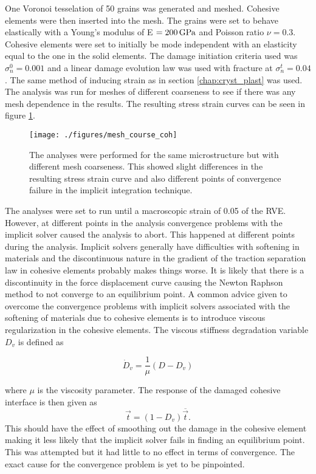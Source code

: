 \documentclass[grain_boundary_law.tex]{subfiles}
\begin{document}
One Voronoi tesselation of 50 grains was generated and meshed. Cohesive elements were then inserted into the mesh. The grains were set to behave elastically with a Young's modulus of E $= \unit[200]{GPa}$ and Poisson ratio $\nu = 0.3$. Cohesive elements were set to initially be mode independent with an elasticity equal to the one in the solid elements. The damage initiation criteria used was $\sigma_n^0 = 0.001$ and a linear damage evolution law was used with fracture at $\sigma_n^t = 0.04$. The same method of inducing strain as in section \ref{chap:cryst_plast} was used. The analysis was run for meshes of different coarseness to see if there was any mesh dependence in the results. The resulting stress strain curves can be seen in figure \ref{fig:coarse_coh}.
%
%
\begin{figure}[htpb!]
\centering
\texttt{[image: ./figures/mesh\_course\_coh]}
\caption{The analyses were performed for the same microstructure but with different mesh coarseness. This showed slight differences in the resulting stress strain curve and also different points of convergence failure in the implicit integration technique.}
\label{fig:coarse_coh}
\end{figure}
%
 The analyses were set to run until a macroscopic strain of 0.05 of the RVE. However, at different points in the analysis convergence problems with the implicit solver caused the analysis to abort. This happened at different points during the analysis. Implicit solvers generally have difficulties with softening in materials and the discontinuous nature in the gradient of the traction separation law in cohesive elements probably makes things worse. It is likely that there is a discontinuity in the force displacement curve causing the Newton Raphson method to not converge to an equilibrium point. A common advice given to overcome the convergence problems with implicit solvers associated with the softening of materials due to cohesive elements is to introduce viscous regularization in the cohesive elements. The viscous stiffness degradation variable $D_v$ is defined as
 
\begin{equation}
  \dot{D}_v = \frac{1}{\mu} (D - D_v)
\end{equation}

where $\mu$ is the viscosity parameter. The response of the damaged cohesive interface is then given as
%
\begin{equation}
  \vec{t} = (1 - D_v) \overline{\vec{t}}.
\end{equation}
%
This should have the effect of smoothing out the damage in the cohesive element making it less likely that the implicit solver fails in finding an equilibrium point. This was attempted but it had little to no effect in terms of convergence. The exact cause for the convergence problem is yet to be pinpointed.
\end{document}
